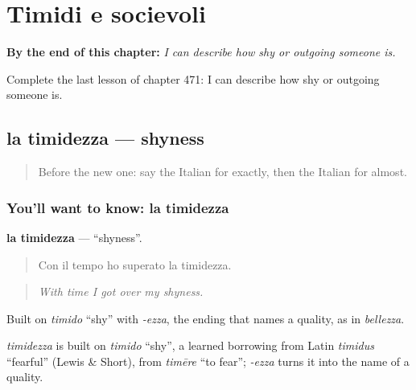 
\chapter{Timidi e socievoli}
\label{ch:it-timidi-e-socievoli}

\begin{chapteropening}
\textbf{By the end of this chapter:} \emph{I can describe how shy or outgoing someone is.}

Complete the last lesson of chapter 471: I can describe how shy or outgoing someone is.
\end{chapteropening}

\section[la timidezza]{la timidezza — shyness}

\label{lesson:IT-C471-timidezza}



\begin{quote}
Before the new one: say the Italian for exactly, then the Italian for almost.
\end{quote}

\subsection*{You'll want to know: la timidezza}
\textbf{la timidezza} — \textquotedblleft{}shyness\textquotedblright{}.

\begin{quote}
Con il tempo ho superato la timidezza.
\end{quote}

\begin{quote}
\emph{With time I got over my shyness.}
\end{quote}

Built on \emph{timido} \textquotedblleft{}shy\textquotedblright{} with \emph{-ezza}, the ending that names a quality, as in \emph{bellezza}.

\begin{cousinweb}
\emph{timidezza} is built on \emph{timido} \textquotedblleft{}shy\textquotedblright{}, a learned borrowing from Latin \emph{timidus} \textquotedblleft{}fearful\textquotedblright{} (Lewis \& Short), from \emph{timēre} \textquotedblleft{}to fear\textquotedblright{}; \emph{-ezza} turns it into the name of a quality.
\end{cousinweb}

